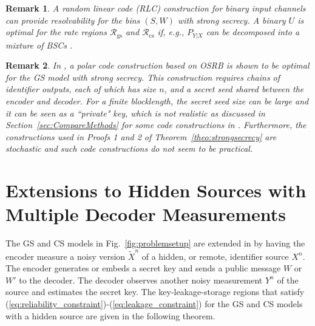 \documentclass[journal,10pt,twoside]{IEEEtran}
\newtheorem{remark}{Remark}
\begin{document}
\begin{remark}
	A random linear code (RLC) construction for binary input channels \cite{GerhardRLC} can provide resolvability for the bins $(S,W)$ with strong secrecy. A binary $U$ is optimal for the rate regions $\mathcal{R}_{\text{gs}}$ and $\mathcal{R}_{\text{cs}}$ if, e.g., $P_{Y|X}$ can be decomposed into a mixture of BSCs \cite[Theorem 3]{bizimTIFSMultipleMeasurement}.
\end{remark}


\begin{remark}\label{rem:RemiPolarNotPractical}
	In \cite[Theorem 10]{RemiPolarConstruction}, a polar code construction based on OSRB is shown to be optimal for the GS model with strong secrecy. This construction requires chains of identifier outputs, each of which has size $n$, and a secret seed shared between the encoder and decoder. For a finite blocklength, the secret seed size can be large and it can be seen as a ``private" key, which is not realistic as discussed in Section~\ref{sec:CompareMethods} for some code constructions in \cite{IgnaPolar}. Furthermore, the constructions used in Proofs 1 and 2 of Theorem~\ref{theo:strongsecrecy} are stochastic and such code constructions do not seem to be practical.
\end{remark}


\section{Extensions to Hidden Sources with Multiple Decoder Measurements}\label{app:hiddenidentifiers}
The GS and CS models in Fig.~\ref{fig:problemsetup} are extended in \cite{bizimTIFSMultipleMeasurement} by having the encoder measure a noisy version $\widetilde{X}^n$ of a hidden, or remote, identifier source $X^n$. The encoder generates or embeds a secret key and sends a public message $W$ or $W'$ to the decoder. The decoder observes another noisy measurement $Y^n$ of the source and estimates the secret key. The key-leakage-storage regions that satisfy (\ref{eq:reliability_constraint})-(\ref{eq:leakage_constraint}) for the GS and CS models with a hidden source are given in the following theorem.
\end{document}
